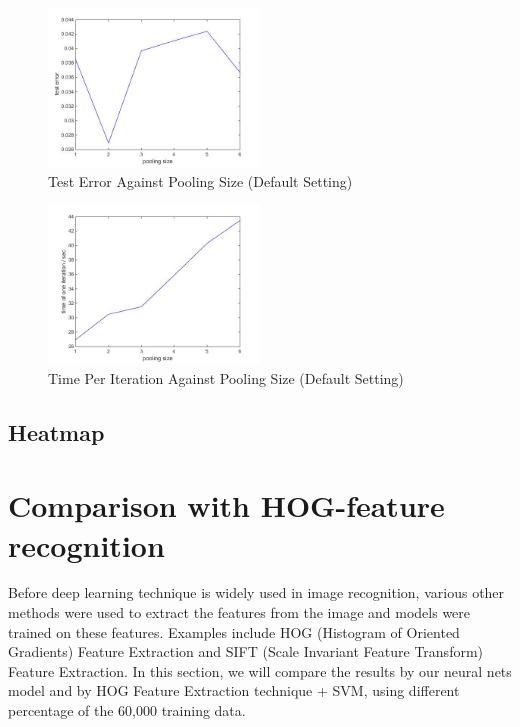 \documentclass[10pt,twocolumn]{article}
\begin{document}
\begin{figure}
\includegraphics[width = 0.5\textwidth]{figure/test_error_vs_pooling_size}
\caption{Test Error Against Pooling Size (Default Setting)}
\label{fig:test_error_vs_pooling_size}
\end{figure}

\begin{figure}
\includegraphics[width = 0.5\textwidth]{figure/iter_time_vs_pooling_size}
\caption{Time Per Iteration Against Pooling Size (Default Setting)}
\label{fig:iter_time_vs_pooling_size}
\end{figure}

\subsection{Heatmap}

\section{Comparison with HOG-feature recognition} \label{sec:evalfeature}

Before deep learning technique is widely used in image recognition, various other methods were used to extract the features from the image and models were trained on these features. Examples include HOG (Histogram of Oriented Gradients)  Feature Extraction and SIFT (Scale Invariant Feature Transform) Feature Extraction. In this section, we will compare the results by our neural nets model and by HOG Feature Extraction technique + SVM, using different percentage of the 60,000 training data.
\end{document}
